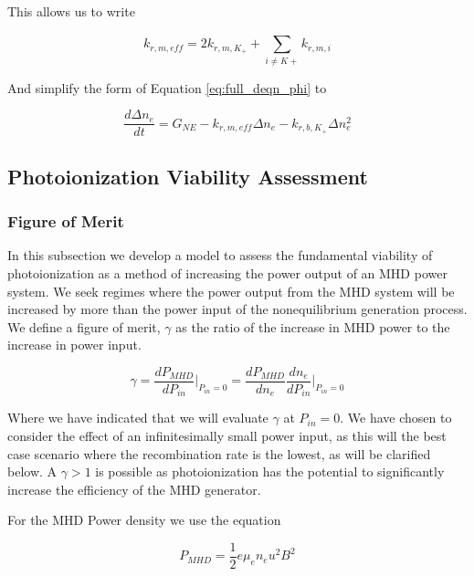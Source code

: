 This allows us to write

\begin{equation}
  k_{r, m, eff} = 2k_{r, m, K_{+}} + \sum_{i \neq K+}^{}k_{r, m, i}
\end{equation}

And simplify the form of Equation \ref{eq:full_deqn_phi} to

\begin{equation}
  \label{eq:final_deqn_Kp}
\frac{d\Delta n_{e}}{dt} = G_{NE}   -   k_{r, m, eff}\Delta n_{e} - k_{r, b, K_{+}}\Delta n_{e}^2
\end{equation}




\subsection{Photoionization Viability Assessment}

\subsubsection{Figure of Merit}

In this subsection we develop a model to assess the fundamental viability of photoionization as a method of increasing the power output of an MHD power system. We seek regimes where the power output from the MHD system will be increased by more than the power input of the nonequilibrium generation process. We define a figure of merit, $\gamma$ as the ratio of the increase in MHD power to the increase in power input.


\begin{equation}
  \label{eq:beta_def}
\gamma = \frac{dP_{MHD}}{dP_{in}} \Big|_{P_{in}=0} = \frac{dP_{MHD}}{dn_{e}}\frac{dn_{e}}{dP_{in}}\Big|_{P_{in}=0}
\end{equation}

Where we have indicated that we will evaluate $\gamma$ at $P_{in} = 0$. We have chosen to consider the effect of an infinitesimally small power input, as this will the best case scenario where the recombination rate is the lowest, as will be clarified below. A $\gamma > 1$ is possible as photoionization has the potential to significantly increase the efficiency of the MHD generator. 

For the MHD Power density we use the equation

\begin{equation}
  \label{eq:mhd_power}
P_{MHD} = \frac{1}{2} e \mu_e n_e u^2 B^2
\end{equation}

